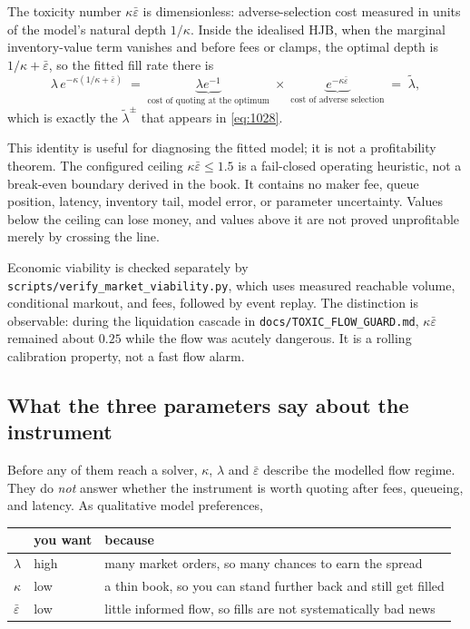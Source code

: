 \documentclass[11pt,a4paper]{article}
\newcommand{\epsb}{\bar{\varepsilon}}
\newcommand{\code}[1]{\texttt{\small #1}}
\begin{document}
\begin{intuition}
The toxicity number $\kappa\epsb$ is dimensionless: adverse-selection cost
measured in units of the model's natural depth $1/\kappa$. Inside the idealised
HJB, when the marginal inventory-value term vanishes and before fees or clamps,
the optimal depth is $1/\kappa + \epsb$, so the fitted fill rate there is
\[
  \lambda\,e^{-\kappa(1/\kappa + \epsb)}
  \;=\; \underbrace{\lambda e^{-1}}_{\text{cost of quoting at the optimum}}
  \;\times\; \underbrace{e^{-\kappa\epsb}}_{\text{cost of adverse selection}}
  \;=\; \tilde{\lambda},
\]
which is exactly the $\tilde{\lambda}^{\pm}$ that appears in \eqref{eq:1028}.

This identity is useful for diagnosing the fitted model; it is not a
profitability theorem. The configured ceiling $\kappa\epsb\le1.5$ is a
fail-closed operating heuristic, not a break-even boundary derived in the book.
It contains no maker fee, queue position, latency, inventory tail, model error,
or parameter uncertainty. Values below the ceiling can lose money, and values
above it are not proved unprofitable merely by crossing the line.

Economic viability is checked separately by
\code{scripts/verify\_market\_viability.py}, which uses measured reachable
volume, conditional markout, and fees, followed by event replay. The distinction
is observable: during the liquidation cascade in
\code{docs/TOXIC\_FLOW\_GUARD.md}, $\kappa\epsb$ remained about $0.25$ while the
flow was acutely dangerous. It is a rolling calibration property, not a fast
flow alarm.
\end{intuition}

\subsection{What the three parameters say about the instrument}

Before any of them reach a solver, $\kappa$, $\lambda$ and $\epsb$ describe the
modelled flow regime. They do \emph{not} answer whether the instrument is worth
quoting after fees, queueing, and latency. As qualitative model preferences,

\begin{center}\small
\begin{tabular}{@{}lll@{}}
\toprule
& \textbf{you want} & \textbf{because} \\
\midrule
$\lambda$   & high & many market orders, so many chances to earn the spread \\
$\kappa$    & low  & a thin book, so you can stand further back and still get filled \\
$\epsb$     & low  & little informed flow, so fills are not systematically bad news \\
\bottomrule
\end{tabular}
\end{center}
\end{document}

